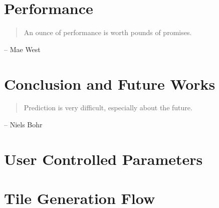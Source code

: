 \documentclass[12pt, final]{ucthesis}
\begin{document}
\begin{dissertationText}
\chapter{Performance                  		  %
    \label{chap:performance}}                
				\begin{quote}
        An ounce of performance is worth pounds of promises.
        \end{quote}
            \begin{flushright}
            -- Mae West 
            \end{flushright}
    

\chapter{Conclusion and Future Works        %
    \label{chap:conclusion}}                
				\begin{quote}
        Prediction is very difficult, especially about the future.
        \end{quote}
            \begin{flushright}
            -- Niels Bohr
            \end{flushright}
    

\clearpage


\ssp


\appendix

\chapter{User Controlled Parameters         %
    \label{appen:op_param}}                
    

\chapter{Tile Generation Flow              %
    \label{appen:tileGen}}                
    
		

\end{dissertationText}
\end{document}

